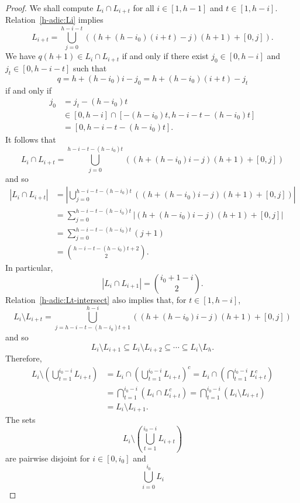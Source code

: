 \documentclass{amsart}
\newcommand{\beq}{\begin{equation}}
\newcommand{\eeq}{\end{equation}}
\begin{document}
\begin{proof}
We shall compute $L_i \cap L_{i+t} $ for all $i \in [1,h-1]$ and $t \in [1,h-i]$.  
Relation~\eqref{h-adic:Li} implies 
\[
L_{i+t} =  \bigcup_{j=0}^{h-i-t} \left(  (h+ (h-i_0)(i+t)-j) (h+1) + [0,j] \right).  
\]
We have $q(h+1) \in L_i \cap L_{i+t} $ if and only if there exist $j_0 \in [0,h-i]$ 
and $j_t \in [0,h-i-t]$ such that 
\[
q = h+ (h-i_0)i-j_0 = h+ (h-i_0)(i+t)-j_t  
\]
if and only if 
\begin{align*}
j_0 & = j_t - (h-i_0)t \\
&  \in [0,h-i] \cap [-(h-i_0)t, h-i - t - (h-i_0)t] \\ 
& = [0,  h-i - t -(h - i_0)t].  
\end{align*}
It follows that 
\beq           \label{h-adic:Lt-intersect}
L_i \cap L_{i+t} = \bigcup_{j=0}^{h-i - t - (h - i_0)t} 
\left(  (h+ (h-i_0)i-j) (h+1) + [0,j] \right) 
\eeq
and so 
\begin{align*}
\left|  L_i \cap L_{i+t}\right| 
& = \left|  \bigcup_{j=0}^{h-i - t -(h -i_0)t} 
\left(  (h+ (h-i_0)i-j) (h+1) + [0,j] \right)\right| \\ 
& =  \sum_{j=0}^{h-i - t -(h -i_0)t} 
\left| (h+ (h-i_0)i-j) (h+1) + [0,j] \right| \\
& = \sum_{j=0}^{h-i - t - (h -i_0)t} (j+1) \\
& = \binom{h-i - t - (h - i_0)t+2}{2}.
\end{align*}
In particular, 
\beq                  \label{h-adic:L1-intersect}
\left|  L_i \cap L_{i+1}\right| = \binom{i_0+1-i}{2}.
\eeq
Relation~\eqref{h-adic:Lt-intersect} also implies that, for $t \in [1,h-i]$,  
\[
L_i \setminus L_{i+t} = \bigcup_{j=h-i - t -(h - i_0)t +1}^{h-i}
\left(  (h+ (h-i_0)i-j) (h+1) + [0,j] \right) 
\]
and so 
\[
L_i \setminus  L_{i+1} \subseteq L_i \setminus  L_{i+2} \subseteq \cdots \subseteq 
L_i \setminus  L_{h}.
 \]
Therefore, 
\begin{align*}
L_i \setminus \left(\bigcup_{t = 1}^{i_0-i} L_{i+t} \right) 
& = L_i \cap \left( \bigcup_{t = 1}^{i_0-i} L_{i+t} \right)^c 
 = L_i \cap \left(\bigcap_{t = 1}^{i_0 -i} L_{i+t}^c \right) \\
& = \bigcap_{t = 1}^{i_0 -i} \left( L_i \cap  L_{i+t}^c \right) 
 = \bigcap_{t = 1}^{i_0 -i} \left( L_i \setminus  L_{i+t}  \right) \\
&  = L_i \setminus  L_{i+1}.
\end{align*}
The sets 
\[
L_i \setminus \left( \bigcup_{t = 1}^{i_0-i} L_{i+t} \right) 
\]
are pairwise disjoint for $i \in [0,i_0]$ and 
\[
 \bigcup_{i=0}^{i_0} L_i 
\]
\end{proof}
\end{document}
